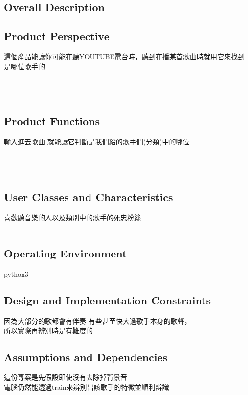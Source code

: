 \documentclass{article}
\begin{document}
\begin{CJK}{UTF8}{bkai}
\section{\huge\bf \color{blue}  Overall Description\\}

\subsection{\Large Product Perspective\\}
 \large 這個產品能讓你可能在聽YOUTUBE電台時，聽到在播某首歌曲時就用它來找到是哪位歌手的\\\\\\\\
\subsection{\Large Product Functions}
\large 輸入進去歌曲 就能讓它判斷是我們給的歌手們(分類)中的哪位\\\\\\\\

\subsection{\Large User Classes and Characteristics\\}
  \Large 喜歡聽音樂的人以及類別中的歌手的死忠粉絲\\\\
\newpage
\subsection{\Large Operating Environment \\}
 \Large python3
\newpage

\subsection{\Large Design and Implementation Constraints\\}
   \Large 因為大部分的歌都會有伴奏 有些甚至快大過歌手本身的歌聲，\\
所以實際再辨別時是有難度的
\newpage
\subsection{\Large  Assumptions and Dependencies\\}
  \Large  這份專案是先假設即使沒有去除掉背景音\\
 電腦仍然能透過train來辨別出該歌手的特徵並順利辨識
\newpage



\end{CJK}
\end{document}

